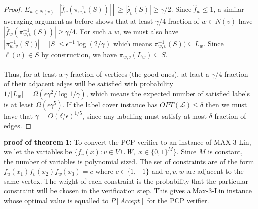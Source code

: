 \documentclass{article}
\newcommand{\1}{\mathbbm{1}}
\begin{document}
\begin{proof}
 $E_{w\in N(v)}[|\hat{f}_w(\pi_{w,v}^{-1}(S))|] \geq |\hat{g}_v(S)|\geq \gamma/2$. Since $\hat{f}_w\leq 1$, a similar averaging argument as before shows that at least $\gamma/4$ fraction of $w\in N(v)$ have $|\hat{f}_w(\pi_{w,v}^{-1}(S))|\geq \gamma/4$. For such a $w$, we must also have $|\pi_{w,v}^{-1}(S))| = |S| \leq \epsilon^{-1}\log{(2/\gamma)}$ which means $\pi_{w,v}^{-1}(S))\subseteq L_w$. Since $\ell(v)\in S$ by construction, we have $\pi_{w,v}(L_w) \subseteq S$.\\\\
 Thus, for at least a $\gamma$ fraction of vertices (the good ones), at least a $\gamma/4$ fraction of their adjacent edges will be satisfied with probability $1/|L_w| = \Omega(\epsilon\gamma^2/\log{1/\gamma})$, which means the expected number of satisfied labels is at least $\Omega(\epsilon\gamma^5)$. If the label cover instance has $OPT(\mathcal{L})\leq \delta$ then we must have that $\gamma = O(\delta/\epsilon)^{1/5}$, since any labelling must satisfy at most $\delta$ fraction of edges.
\end{proof}
\textbf{proof of theorem 1:} To convert the PCP verifier to an instance of MAX-3-Lin, we let the variables be $\{f_v(x):v\in V\cup W, \; x\in \{0,1\}^M\}$. Since $M$ is constant, the number of variables is polynomial sized. The set of constraints are of the form $f_u(x_1)f_{v}(x_2)f_{w}(x_3) = c$ where $c\in \{1,-1\}$  and $u,v,w$ are adjacent to the same vertex. The weight of each constraint is the probability that the particular constraint will be chosen in the verification step. This gives a Max-3-Lin instance whose optimal value is equalled to $P[Accept]$ for the PCP verifier.
\end{document}
